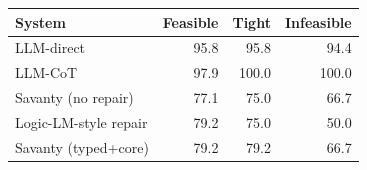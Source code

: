 \begin{tabular}{lrrr}
\toprule
System & Feasible & Tight & Infeasible \\
\midrule
LLM-direct & 95.8 & 95.8 & 94.4 \\
LLM-CoT & 97.9 & 100.0 & 100.0 \\
Savanty (no repair) & 77.1 & 75.0 & 66.7 \\
Logic-LM-style repair & 79.2 & 75.0 & 50.0 \\
Savanty (typed+core) & 79.2 & 79.2 & 66.7 \\
\bottomrule
\end{tabular}
